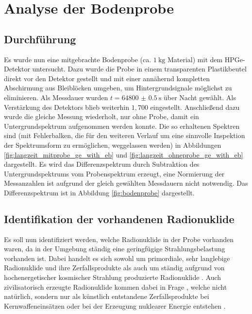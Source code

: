 \chapter{Analyse der Bodenprobe}\label{sec:bodenprobe}

\section{Durchführung}

Es wurde nun eine mitgebrachte Bodenprobe (ca. $\SI{1}{\kg}$ Material) mit dem HPGe-Detektor untersucht. Dazu wurde die Probe in einem transparenten Plastikbeutel direkt vor den Detektor gestellt und mit einer annähernd kompletten Abschirmung aus Bleiblöcken umgeben, um Hintergrundsignale möglichst zu eliminieren. Als Messdauer wurden $t=\SI{64800(0.5)}{\second}$ über Nacht gewählt. Als Verstärkung des Detektors blieb weiterhin $1,700$ eingestellt. Anschließend dazu wurde die gleiche Messung wiederholt, nur ohne Probe, damit ein Untergrundspektrum aufgenommen werden konnte. Die so erhaltenen Spektren sind (mit Fehlerbalken, die für den weiteren Verlauf um eine sinnvolle Inspektion der Spektrumsform zu ermöglichen, weggelassen werden) in Abbildungen \ref{fig:langzeit_mitprobe_ge_with_eb} und \ref{fig:langzeit_ohneprobe_ge_with_eb} dargestellt. Es wird das Differenzspektrum durch Subtraktion des Untergrundspektrums vom Probenspektrum erzeugt, eine Normierung der Messanzahlen ist aufgrund der gleich gewählten Messdauern nicht notwendig. Das Differenzspektrum ist in Abbildung \ref{fig:bodenprobe} dargestellt.

\section{Identifikation der vorhandenen Radionuklide}
Es soll nun identifiziert werden, welche Radionuklide in der Probe vorhanden waren, da in der Umgebung ständig eine geringfügige Strahlungsbelastung vorhanden ist. Dabei handelt es sich sowohl um primordiale, sehr langlebige Radionuklide und ihre Zerfallsprodukte als auch um ständig aufgrund von hochenergetischer kosmischer Strahlung produzierte Radionuklide \cite[55-58]{ex_techniques}. Auch zivilisatorisch erzeugte Radionuklide kommen dabei in Frage \cite[7]{521versuchsanleitung}, welche nicht natürlich, sondern nur als künstlich entstandene Zerfallsprodukte bei Kernwaffeneinsätzen oder bei der Erzeugung nuklearer Energie entstehen \cite[73]{leotechniques}.

